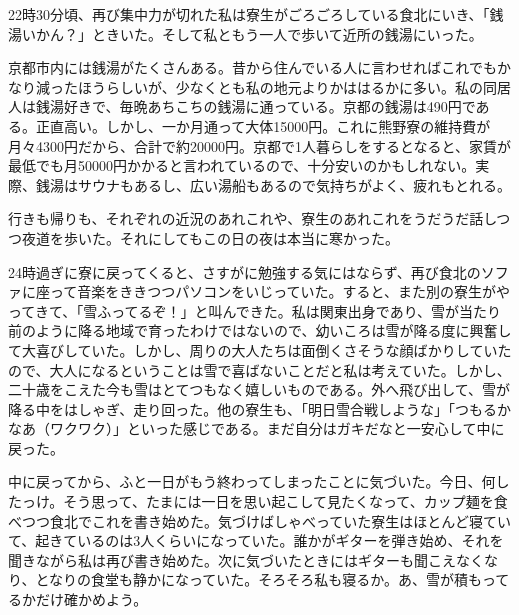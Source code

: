 \par
22時30分頃、再び集中力が切れた私は寮生がごろごろしている食北にいき、「銭湯いかん？」ときいた。そして私ともう一人で歩いて近所の銭湯にいった。

\par
京都市内には銭湯がたくさんある。昔から住んでいる人に言わせればこれでもかなり減ったほうらしいが、少なくとも私の地元よりかははるかに多い。私の同居人は銭湯好きで、毎晩あちこちの銭湯に通っている。京都の銭湯は490円である。正直高い。しかし、一か月通って大体15000円。これに熊野寮の維持費が月々4300円だから、合計で約20000円。京都で1人暮らしをするとなると、家賃が最低でも月50000円かかると言われているので、十分安いのかもしれない。実際、銭湯はサウナもあるし、広い湯船もあるので気持ちがよく、疲れもとれる。

\par
行きも帰りも、それぞれの近況のあれこれや、寮生のあれこれをうだうだ話しつつ夜道を歩いた。それにしてもこの日の夜は本当に寒かった。

\par
24時過ぎに寮に戻ってくると、さすがに勉強する気にはならず、再び食北のソファに座って音楽をききつつパソコンをいじっていた。すると、また別の寮生がやってきて、「雪ふってるぞ！」と叫んできた。私は関東出身であり、雪が当たり前のように降る地域で育ったわけではないので、幼いころは雪が降る度に興奮して大喜びしていた。しかし、周りの大人たちは面倒くさそうな顔ばかりしていたので、大人になるということは雪で喜ばないことだと私は考えていた。しかし、二十歳をこえた今も雪はとてつもなく嬉しいものである。外へ飛び出して、雪が降る中をはしゃぎ、走り回った。他の寮生も、「明日雪合戦しような」「つもるかなあ（ワクワク）」といった感じである。まだ自分はガキだなと一安心して中に戻った。

\par
中に戻ってから、ふと一日がもう終わってしまったことに気づいた。今日、何したっけ。そう思って、たまには一日を思い起こして見たくなって、カップ麺を食べつつ食北でこれを書き始めた。気づけばしゃべっていた寮生はほとんど寝ていて、起きているのは3人くらいになっていた。誰かがギターを弾き始め、それを聞きながら私は再び書き始めた。次に気づいたときにはギターも聞こえなくなり、となりの食堂も静かになっていた。そろそろ私も寝るか。あ、雪が積もってるかだけ確かめよう。

